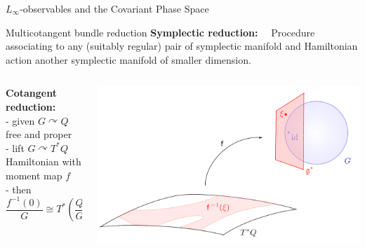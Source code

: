 \documentclass[handout,10pt]{beamer}
\renewcommand{\action}{\curvearrowright}
\begin{document}
\begin{frame}{$L_\infty$-observables and the Covariant Phase Space}
\end{frame}



\begin{frame}{Multicotangent bundle reduction}
	\textbf{\color{UniGreen}Symplectic reduction:}~~
	 Procedure associating to any (suitably regular) pair of symplectic manifold and Hamiltonian action another symplectic manifold of smaller dimension.
	\vfill
	\pause

	\begin{columns}
		\begin{column}{0.65\textwidth}
				\textbf{\color{UniGreen}Cotangent reduction:}~~
				\\- given $G\action Q$ free and proper
				\\- lift $G\action T^\ast Q$ Hamiltonian with moment map $f$
				\\- then $$ \frac{f^{-1}(0)}{G}\cong T^\ast(\frac{Q}{G})~.$$
		\end{column}	
		\begin{column}{0.350\textwidth}
			\includegraphics[width=\textwidth]{./Pictures/Reduction}
		\end{column}	
	\end{columns}	
	\vfill
	\pause
	

\end{frame}
\end{document}
